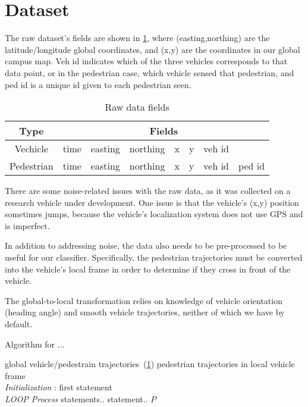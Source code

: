 
\section{Dataset} \label{sec:dataset}


The raw dataset's fields are shown in \cref{table_data}, where (easting,northing) are the latitude/longitude global coordinates, and (x,y) are the coordinates in our global campus map.
Veh id indicates which of the three vehicles corresponds to that data point, or in the pedestrian case, which vehicle sensed that pedestrian, and ped id is a unique id given to each pedestrian seen.

\begin{table}[ht!]
\centering
\begin{tabular}{||c||c c c c c c c||}  
 \hline
 \multirow{1}{*}{Type} &
       \multicolumn{7}{c||}{Fields} \\
 \hline\hline
 Vechicle & time & easting & northing & x & y & veh id & \\ \hline
 Pedestrian & time & easting & northing & x & y & veh id & ped id \\ \hline
\end{tabular}
\caption{Raw data fields}
\label{table_data}
\end{table}

There are some noise-related issues with the raw data, as it was collected on a research vehicle under development.
One issue is that the vehicle's (x,y) position sometimes jumps, because the vehicle's localization system does not use GPS and is imperfect.

In addition to addressing noise, the data also needs to be pre-processed to be useful for our classifier.
Specifically, the pedestrian trajectories must be converted into the vehicle's local frame in order to determine if they cross in front of the vehicle.

The global-to-local transformation relies on knowledge of vehicle orientation (heading angle) and smooth vehicle trajectories, neither of which we have by default.

\begin{algorithm}
 \caption{Algorithm for ...}
 \begin{algorithmic}[1]
 \renewcommand{\algorithmicrequire}{\textbf{Input:}}
 \renewcommand{\algorithmicensure}{\textbf{Output:}}
 \REQUIRE global vehicle/pedestrain trajectories~(\cref{table_data})
 \ENSURE  pedestrian trajectories in local vehicle frame
 \\ \textit{Initialization} :
  \STATE first statement
 \\ \textit{LOOP Process}
  \STATE statements..
  \STATE statement..
  \ENDIF
  \ENDFOR
 \RETURN $P$ 

 \end{algorithmic} 
 \end{algorithm}



